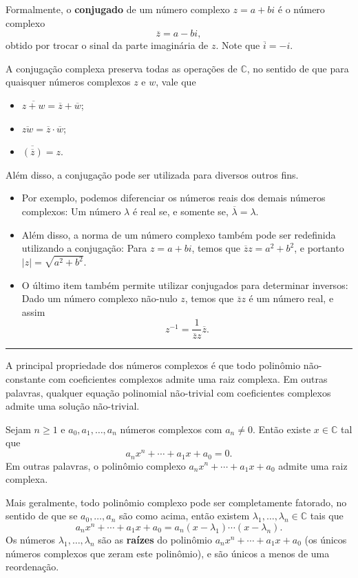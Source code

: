 Formalmente, o \textbf{conjugado} de um número complexo $z=a+bi$ é o número complexo
\[\overline{z}=a-bi,\]
obtido por trocar o sinal da parte imaginária de $z$. Note que $\overline{i}=-i$.

A conjugação complexa preserva todas as operações de $\mathbb{C}$, no sentido de que para quaisquer números complexos $z$ e $w$, vale que
\begin{itemize}
	\item $\overline{z+w}=\overline{z}+\overline{w}$;
	\item $\overline{zw}=\overline{z}\cdot\overline{w}$;
	\item $\overline{\left(\overline{z}\right)}=z$.
\end{itemize}

Além disso, a conjugação pode ser utilizada para diversos outros fins.
\begin{itemize}
	\item Por exemplo, podemos diferenciar os números reais dos demais números complexos: Um número $\lambda$ é real se, e somente se, $\overline{\lambda}=\lambda$.
	\item Além disso, a norma de um número complexo também pode ser redefinida utilizando a conjugação: Para $z=a+bi$, temos que $\overline{z}z=a^2+b^2$, e portanto $|z|=\sqrt{a^2+b^2}$.
	\item O último item também permite utilizar conjugados para determinar inversos: Dado um número complexo não-nulo $z$, temos que $\overline{z}z$ é um número real, e assim
	\[z^{-1}=\frac{1}{\overline{z}z}\overline{z}.\]
\end{itemize}

\hrule

A principal propriedade dos números complexos é que todo polinômio não-constante com coeficientes complexos admite uma raiz complexa. Em outras palavras, qualquer equação polinomial não-trivial com coeficientes complexos admite uma solução não-trivial.

\begin{theorem}
	Sejam $n\geq 1$ e $a_0,a_1,\ldots,a_n$ números complexos com $a_n\neq 0$. Então existe $x\in\mathbb{C}$ tal que
	\[a_nx^n+\cdots+a_1x+a_0=0.\]
	Em outras palavras, o polinômio complexo $a_nx^n+\cdots+a_1x+a_0$ admite uma raiz complexa.
	
	Mais geralmente, todo polinômio complexo pode ser completamente fatorado, no sentido de que se $a_0,\ldots,a_n$ são como acima, então existem $\lambda_1,\ldots,\lambda_n\in\mathbb{C}$ tais que
	\[a_nx^n+\cdots+a_1 x+a_0=a_n(x-\lambda_1)\cdots(x-\lambda_n).\]
	Os números $\lambda_1,\ldots,\lambda_n$ são as \textbf{raízes} do polinômio $a_nx^n+\cdots+a_1x+a_0$ (os únicos números complexos que zeram este polinômio), e são únicos a menos de uma reordenação.
\end{theorem}

